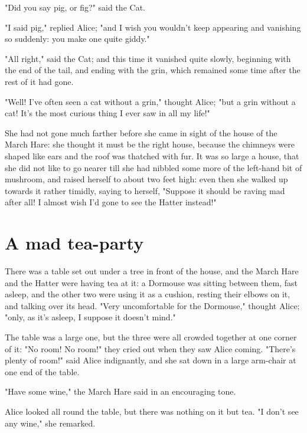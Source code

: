 "Did you say pig, or fig?" said the Cat.

"I said pig," replied Alice; "and I wish you wouldn't keep appearing and vanishing so suddenly: you make one quite giddy."

"All right," said the Cat; and this time it vanished quite slowly, beginning with the end of the tail, and ending with the grin, which remained some time after the rest of it had gone.

​"Well! I've often seen a cat without a grin," thought Alice; "but a grin without a cat! It's the most curious thing I ever saw in all my life!"

She had not gone much farther before she came in sight of the house of the March Hare: she thought it must be the right house, because the chimneys were shaped like ears and the roof was thatched with fur. It was so large a house, that she did not like to go nearer till she had nibbled some more of the left-hand bit of mushroom, and raised herself to about two feet high: even then she walked up towards it rather timidly, saying to herself, "Suppose it should be raving mad after all! I almost wish I'd gone to see the Hatter instead!"

\quebra\chapter*{A mad tea-party}

There was a table set out under a tree in front of the house, and the March Hare and the Hatter were having tea at it: a Dormouse was sitting between them, fast asleep, and the other two were using it as a cushion, resting their elbows on it, and talking over its head. "Very uncomfortable for the Dormouse," thought Alice; "only, as it's asleep, I suppose it doesn't mind."

The table was a large one, but the three were all crowded together at one corner of it: "No room! No room!" they cried out when they saw Alice coming. "There's plenty of room!" said ​Alice indignantly, and she sat down in a large arm-chair at one end of the table.

"Have some wine," the March Hare said in an encouraging tone.

Alice looked all round the table, but there was nothing on it but tea. "I don't see any wine," she remarked.

